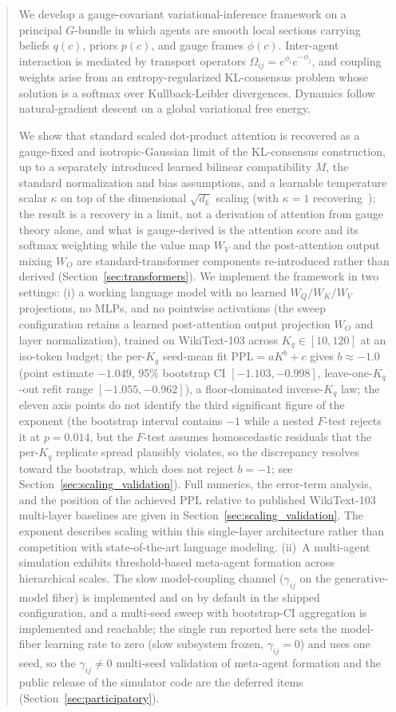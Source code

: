 \documentclass[11pt]{article}
\begin{document}
\begin{abstract}
We develop a gauge-covariant variational-inference framework on a principal $G$-bundle in which agents are smooth local sections carrying beliefs $q(c)$, priors $p(c)$, and gauge frames $\phi(c)$. Inter-agent interaction is mediated by transport operators $\Omega_{ij} = e^{\phi_i} e^{-\phi_j}$, and coupling weights arise from an entropy-regularized KL-consensus problem whose solution is a softmax over Kullback-Leibler divergences. Dynamics follow natural-gradient descent on a global variational free energy.

We show that standard scaled dot-product attention is recovered as a gauge-fixed and isotropic-Gaussian limit of the KL-consensus construction, up to a separately introduced learned bilinear compatibility $M$, the standard normalization and bias assumptions, and a learnable temperature scalar $\kappa$ on top of the dimensional $\sqrt{d_k}$ scaling (with $\kappa = 1$ recovering~\cite{vaswani2017attention}); the result is a recovery in a limit, not a derivation of attention from gauge theory alone, and what is gauge-derived is the attention score and its softmax weighting while the value map $W_V$ and the post-attention output mixing $W_O$ are standard-transformer components re-introduced rather than derived (Section~\ref{sec:transformers}). We implement the framework in two settings: (i) a working language model with no learned $W_Q/W_K/W_V$ projections, no MLPs, and no pointwise activations (the sweep configuration retains a learned post-attention output projection $W_O$ and layer normalization), trained on WikiText-103 across $K_q \in [10,120]$ at an iso-token budget; the per-$K_q$ seed-mean fit $\mathrm{PPL} = aK^b + c$ gives $b \approx -1.0$ (point estimate $-1.049$, 95\% bootstrap CI $[-1.103, -0.998]$, leave-one-$K_q$-out refit range $[-1.055, -0.962]$), a floor-dominated inverse-$K_q$ law; the eleven axis points do not identify the third significant figure of the exponent (the bootstrap interval contains $-1$ while a nested $F$-test rejects it at $p = 0.014$, but the $F$-test assumes homoscedastic residuals that the per-$K_q$ replicate spread plausibly violates, so the discrepancy resolves toward the bootstrap, which does not reject $b = -1$; see Section~\ref{sec:scaling_validation}). Full numerics, the error-term analysis, and the position of the achieved PPL relative to published WikiText-103 multi-layer baselines are given in Section~\ref{sec:scaling_validation}. The exponent describes scaling within this single-layer architecture rather than competition with state-of-the-art language modeling. (ii)~A multi-agent simulation exhibits threshold-based meta-agent formation across hierarchical scales. The slow model-coupling channel ($\gamma_{ij}$ on the generative-model fiber) is implemented and on by default in the shipped configuration, and a multi-seed sweep with bootstrap-CI aggregation is implemented and reachable; the single run reported here sets the model-fiber learning rate to zero (slow subsystem frozen, $\gamma_{ij} = 0$) and uses one seed, so the $\gamma_{ij} \neq 0$ multi-seed validation of meta-agent formation and the public release of the simulator code are the deferred items (Section~\ref{sec:participatory}).


\end{abstract}
\end{document}
